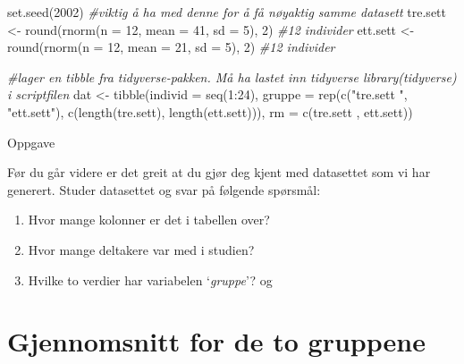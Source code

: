 \documentclass[
]{book}
\newenvironment{Shaded}{\begin{snugshade}}{\end{snugshade}}
\newcommand{\AttributeTok}[1]{\textcolor[rgb]{0.77,0.63,0.00}{#1}}
\newcommand{\CommentTok}[1]{\textcolor[rgb]{0.56,0.35,0.01}{\textit{#1}}}
\newcommand{\DecValTok}[1]{\textcolor[rgb]{0.00,0.00,0.81}{#1}}
\newcommand{\FunctionTok}[1]{\textcolor[rgb]{0.00,0.00,0.00}{#1}}
\newcommand{\NormalTok}[1]{#1}
\newcommand{\OtherTok}[1]{\textcolor[rgb]{0.56,0.35,0.01}{#1}}
\newcommand{\SpecialCharTok}[1]{\textcolor[rgb]{0.00,0.00,0.00}{#1}}
\newcommand{\StringTok}[1]{\textcolor[rgb]{0.31,0.60,0.02}{#1}}
\providecommand{\tightlist}{%
  \setlength{\itemsep}{0pt}\setlength{\parskip}{0pt}}
\begin{document}
\begin{Shaded}
\begin{Highlighting}[]
\FunctionTok{set.seed}\NormalTok{(}\DecValTok{2002}\NormalTok{) }\CommentTok{\#viktig å ha med denne for å få nøyaktig samme datasett}
\NormalTok{tre.sett }\OtherTok{\textless{}{-}} \FunctionTok{round}\NormalTok{(}\FunctionTok{rnorm}\NormalTok{(}\AttributeTok{n =} \DecValTok{12}\NormalTok{, }\AttributeTok{mean =} \DecValTok{41}\NormalTok{, }\AttributeTok{sd =} \DecValTok{5}\NormalTok{), }\DecValTok{2}\NormalTok{) }\CommentTok{\#12 individer}
\NormalTok{ett.sett }\OtherTok{\textless{}{-}} \FunctionTok{round}\NormalTok{(}\FunctionTok{rnorm}\NormalTok{(}\AttributeTok{n =} \DecValTok{12}\NormalTok{, }\AttributeTok{mean =} \DecValTok{21}\NormalTok{, }\AttributeTok{sd =} \DecValTok{5}\NormalTok{), }\DecValTok{2}\NormalTok{) }\CommentTok{\#12 individer}

\CommentTok{\#lager en tibble fra tidyverse{-}pakken. Må ha lastet inn tidyverse library(tidyverse) i scriptfilen}
\NormalTok{dat }\OtherTok{\textless{}{-}} \FunctionTok{tibble}\NormalTok{(}\AttributeTok{individ =} \FunctionTok{seq}\NormalTok{(}\DecValTok{1}\SpecialCharTok{:}\DecValTok{24}\NormalTok{),}
              \AttributeTok{gruppe =} \FunctionTok{rep}\NormalTok{(}\FunctionTok{c}\NormalTok{(}\StringTok{"tre.sett "}\NormalTok{, }\StringTok{"ett.sett"}\NormalTok{), }\FunctionTok{c}\NormalTok{(}\FunctionTok{length}\NormalTok{(tre.sett), }\FunctionTok{length}\NormalTok{(ett.sett))),}
              \AttributeTok{rm =} \FunctionTok{c}\NormalTok{(tre.sett , ett.sett))}
\end{Highlighting}
\end{Shaded}

{Oppgave}

Før du går videre er det greit at du gjør deg kjent med datasettet som vi har generert. Studer datasettet og svar på følgende spørsmål:

\begin{enumerate}
\def\labelenumi{\alph{enumi})}
\tightlist
\item
  Hvor mange kolonner er det i tabellen over?
\item
  Hvor mange deltakere var med i studien?
\item
  Hvilke to verdier har variabelen `\emph{gruppe}'? og
\end{enumerate}

\hypertarget{gjennomsnitt-for-de-to-gruppene}{%
\section{Gjennomsnitt for de to gruppene}\label{gjennomsnitt-for-de-to-gruppene}}
\end{document}
